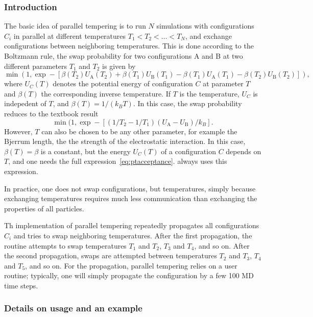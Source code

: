 \subsubsection{Introduction}

The basic idea of parallel tempering is to run $N$ simulations with configurations $C_i$ in
parallel at different temperatures $T_1<T_2<\hdots<T_N$, and exchange configurations between
neighboring temperatures. This is done according to the Boltzmann rule, \ie the swap probability
for two configurations A and B at two different parameters $T_1$ and $T_2$ is given by
\begin{equation}
  \label{eq:ptacceptance}
  \min\left(1,\exp -\left[\beta(T_2)U_\text{A}(T_2) + \beta(T_1)U_\text{B}(T_1) -
    \beta(T_1)U_\text{A}(T_1) - \beta(T_2)U_\text{B}(T_2)\right]\right),
\end{equation}
where $U_C(T)$ denotes the potential energy of configuration $C$ at parameter $T$ and $\beta(T)$
the corresponding inverse temperature. If $T$ is the temperature, $U_C$ is indepedent of $T$, and
$\beta(T)=1/(k_BT)$. In this case, the swap probability reduces to the textbook result
\begin{equation}
  \min(1,\exp -\left[\left(1/T_2 - 1/T_1\right)\left(U_\text{A} - U_\text{B}\right)/k_B\right].
\end{equation}
However, $T$ can also be chosen to be any other parameter, for example the Bjerrum length, \ie the
the strength of the electrostatic interaction. In this case, $\beta(T)=\beta$ is a constant, but
the energy $U_C(T)$ of a configuration $C$ depends on $T$, and one needs the full
expression~\eqref{eq:ptacceptance}. \es{} always uses this expression.

In practice, one does not swap configurations, but temperatures, simply because exchanging
temperatures requires much less communication than exchanging the properties of all particles.

Th \es{} implementation of parallel tempering repeatedly propagates all configurations $C_i$ and
tries to swap neighboring temperatures. After the first propagation, the routine attempts to swap
temperatures $T_1$ and $T_2$, $T_3$ and $T_4$, and so on. After the second propagation, swaps are
attempted between temperatures $T_2$ and $T_3$, $T_4$ and $T_5$, and so on.  For the propagation,
parallel tempering relies on a user routine; typically, one will simply propagate the configuration
by a few 100 MD time steps.

\subsubsection{Details on usage and an example}


